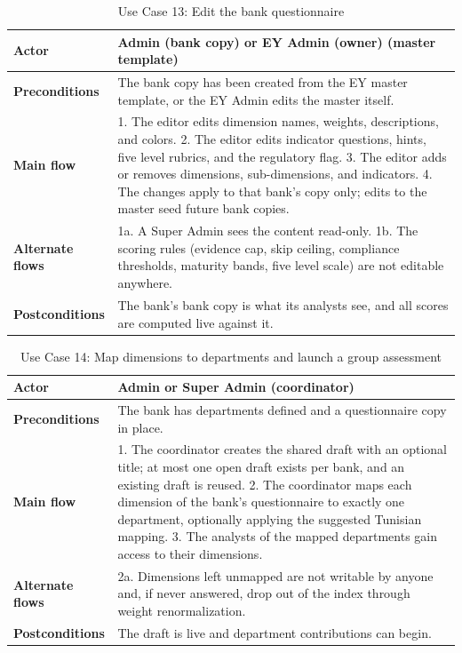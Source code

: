 \begin{table}[H]
\centering
\caption{Use Case 13: Edit the bank questionnaire} \label{tab:uc13}
\begin{tabular}{|p{3cm}|p{12cm}|}
\hline
\textbf{Actor} & Admin (bank copy) or EY Admin (owner) (master template) \\
\hline
\textbf{Preconditions} & The bank copy has been created from the EY master template, or the EY Admin edits the master itself. \\
\hline
\textbf{Main flow} & 1. The editor edits dimension names, weights, descriptions, and colors. 2. The editor edits indicator questions, hints, five level rubrics, and the regulatory flag. 3. The editor adds or removes dimensions, sub-dimensions, and indicators. 4. The changes apply to that bank's copy only; edits to the master seed future bank copies. \\
\hline
\textbf{Alternate flows} & 1a. A Super Admin sees the content read-only. 1b. The scoring rules (evidence cap, skip ceiling, compliance thresholds, maturity bands, five level scale) are not editable anywhere. \\
\hline
\textbf{Postconditions} & The bank's bank copy is what its analysts see, and all scores are computed live against it. \\
\hline
\end{tabular}

\end{table}

\begin{table}[H]
\centering
\caption{Use Case 14: Map dimensions to departments and launch a group assessment} \label{tab:uc14}
\begin{tabular}{|p{3cm}|p{12cm}|}
\hline
\textbf{Actor} & Admin or Super Admin (coordinator) \\
\hline
\textbf{Preconditions} & The bank has departments defined and a questionnaire copy in place. \\
\hline
\textbf{Main flow} & 1. The coordinator creates the shared draft with an optional title; at most one open draft exists per bank, and an existing draft is reused. 2. The coordinator maps each dimension of the bank's questionnaire to exactly one department, optionally applying the suggested Tunisian mapping. 3. The analysts of the mapped departments gain access to their dimensions. \\
\hline
\textbf{Alternate flows} & 2a. Dimensions left unmapped are not writable by anyone and, if never answered, drop out of the index through weight renormalization. \\
\hline
\textbf{Postconditions} & The draft is live and department contributions can begin. \\
\hline
\end{tabular}

\end{table}

